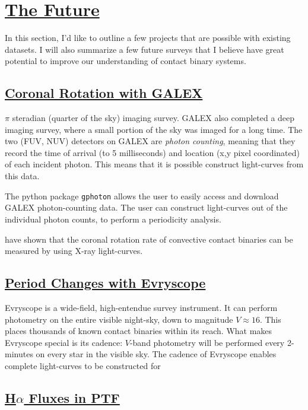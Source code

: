 \documentclass[12pt]{article} %
\numberwithin{equation}{section} %
\begin{document}
\citep{bradstreet1988mapping}


\section[The Future]{\hyperlink{toc}{The Future}}

In this section, I'd like to outline a few projects that are possible with existing datasets. I will also summarize a few future surveys that I believe have great potential to improve our understanding of contact binary systems.

\subsection[Coronal Rotation with GALEX]{\hyperlink{toc}{Coronal Rotation with GALEX}}

$\pi$ steradian (quarter of the sky) imaging survey. GALEX also completed a deep imaging survey, where a small portion of the sky was imaged for a long time. The two (FUV, NUV) detectors on GALEX are \emph{photon counting}, meaning that they record the time of arrival (to 5 milliseconds) and location (x,y pixel coordinated) of each incident photon. This means that it is possible construct light-curves from this data.

The python package \texttt{gphoton} allows the user to easily access and download GALEX photon-counting data. The user can construct light-curves out of the individual photon counts, to perform a periodicity analysis.

\citet{mccale1996rosat} have shown that the coronal rotation rate of convective contact binaries can be measured by using X-ray light-curves.

\subsection[Period Changes with Evryscope]{\hyperlink{toc}{Period Changes with Evryscope}}

Evryscope is a wide-field, high-entendue survey instrument. It can perform photometry on the entire visible night-sky, down to magnitude $V \approx 16$. This places thousands of known contact binaries within its reach. What makes Evryscope special is its cadence: $V$-band photometry will be performed every 2-minutes on every star in the visible sky. The cadence of Evryscope enables complete light-curves to be constructed for  

\subsection[H$\alpha$ Fluxes in PTF]{\hyperlink{toc}{H$\alpha$ Fluxes in PTF}}
\end{document}
